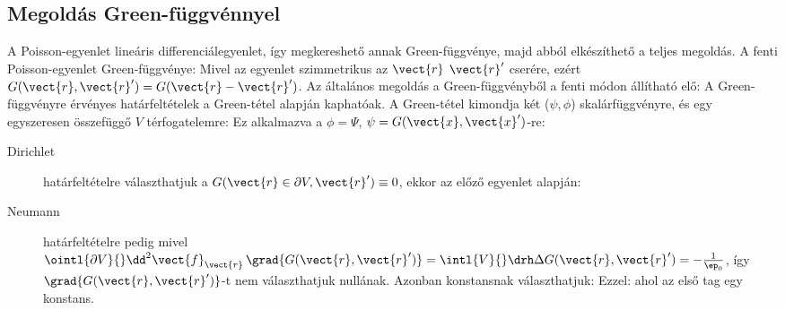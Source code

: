   \subsection{Megoldás Green-függvénnyel}
   
   A Poisson-egyenlet lineáris differenciálegyenlet, így megkereshető annak Green-függvénye, majd abból elkészíthető a teljes megoldás.
   A fenti Poisson-egyenlet Green-függvénye:
   Mivel az egyenlet szimmetrikus az $\vect{r}$ $\vect{r}'$ cserére, ezért $G(\vect{r},\vect{r}')=G(\vect{r}-\vect{r}')$.
   Az általános megoldás a Green-függvényből a fenti módon állítható elő:
   A Green-függvényre érvényes határfeltételek a Green-tétel alapján kaphatóak.
   A Green-tétel kimondja két ($\psi,\phi$) skalárfüggvényre, és egy egyszeresen összefüggő $V$ térfogatelemre:
   Ez alkalmazva a $\phi=\Psi$, $\psi=G(\vect{x},\vect{x}')$-re:
   \begin{description}
    \item[Dirichlet] határfeltételre választhatjuk a $G(\vect{r}\in\partial V,\vect{r}')\equiv 0$, ekkor az előző egyenlet alapján:
    \item[Neumann] határfeltételre pedig mivel $\ointl{\partial V}{}\dd^2\vect{f}_{\vect{r}}\,\grad{G(\vect{r},\vect{r}')}=\intl{V}{}\drh \Delta G(\vect{r},\vect{r}')=-\frac{1}{\ep_0}$, így $\grad{G(\vect{r},\vect{r}')}$-t nem választhatjuk nullának.
   Azonban konstansnak választhatjuk: 
    Ezzel: 
    ahol az első tag egy konstans. 
   \end{description}
   
